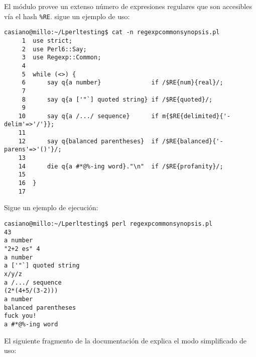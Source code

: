 
El módulo  provee un extenso número 
de expresiones regulares que son accesibles vía el hash \verb|%RE|.
sigue un ejemplo de uso:
\begin{verbatim}
casiano@millo:~/Lperltesting$ cat -n regexpcommonsynopsis.pl
     1  use strict;
     2  use Perl6::Say;
     3  use Regexp::Common;
     4
     5  while (<>) {
     6      say q{a number}              if /$RE{num}{real}/;
     7
     8      say q{a ['"`] quoted string} if /$RE{quoted}/;
     9
    10      say q{a /.../ sequence}      if m{$RE{delimited}{'-delim'=>'/'}};
    11
    12      say q{balanced parentheses}  if /$RE{balanced}{'-parens'=>'()'}/;
    13
    14      die q{a #*@%-ing word}."\n"  if /$RE{profanity}/;
    15
    16  }
    17
\end{verbatim}
Sigue un ejemplo de ejecución:
\begin{verbatim}
casiano@millo:~/Lperltesting$ perl regexpcommonsynopsis.pl
43
a number
"2+2 es" 4
a number
a ['"`] quoted string
x/y/z
a /.../ sequence
(2*(4+5/(3-2)))
a number
balanced parentheses
fuck you!
a #*@%-ing word
\end{verbatim}

El siguiente fragmento de la documentación 
de 
explica el modo simplificado de uso:

